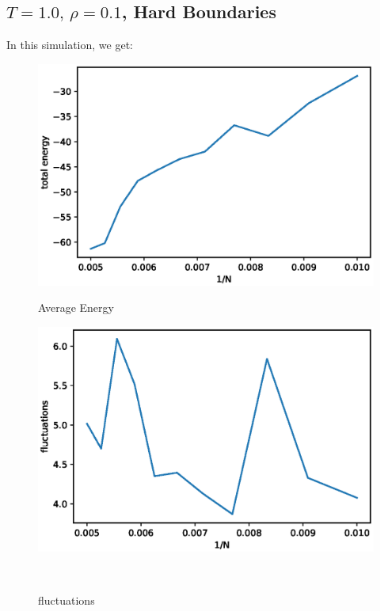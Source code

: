 \documentclass[UTF8,a4paper]{article}
\begin{document}
\subsection{$T =1.0,\, \rho = 0.1$, Hard Boundaries}
In this simulation, we get:
\begin{figure}[H]
	\centering
	\begin{minipage}[t]{0.45\textwidth}
		\centering
		\includegraphics[height=0.2\textheight]{fig/sc_exp2_e_hard.eps}
		\caption{Average Energy}
	\end{minipage}\hspace{0.5cm}
	\begin{minipage}[t]{0.45\textwidth}
		\centering
		\includegraphics[height=0.2\textheight]{fig/sc_exp2_p_hard.eps}
		\caption{fluctuations}
	\end{minipage}\\
	\begin{minipage}[t]{0.6\textwidth}

\end{minipage}
\end{figure}
\end{document}
